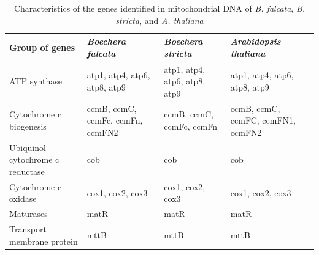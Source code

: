 \documentclass[9pt,twocolumn,twoside,lineno]{gsag3jnl}
\begin{document}
\begin{table}[p]
\centering
\caption{Characteristics of the genes identified in mitochondrial DNA of \textit{B. falcata}, \textit{B. stricta}, and \textit{A. thaliana}}
\begin{tableminipage}{\textwidth}
\begin{tabularx}{\textwidth}{@{}XXXX@{}}
\hline
\textbf{Group of genes}          & \textit{\textbf{Boechera falcata}}                                                                    & \textit{\textbf{Boechera stricta} }                                                        & \textit{\textbf{Arabidopsis thaliana}}                                                    \\
\hline
ATP synthase                     & atp1, atp4, atp6, atp8, atp9                                                                          & atp1, atp4, atp6, atp8, atp9                                                              & atp1, atp4, atp6, atp8, atp9                                                              \\
Cytochrome c biogenesis          & ccmB, ccmC, ccmFc, ccmFn, ccmFN2                                                                      & ccmB, ccmC, ccmFc, ccmFn                                                                  & ccmB, ccmC, ccmFC, ccmFN1, ccmFN2                                                         \\
Ubiquinol cytochrome c reductase & cob                                                                                                   & cob                                                                                       & cob                                                                                       \\
Cytochrome c oxidase             & cox1, cox2, cox3                                                                                      & cox1, cox2, cox3                                                                          & cox1, cox2, cox3                                                                          \\
Maturases                        & matR                                                                                                  & matR                                                                                      & matR                                                                                      \\
Transport membrane protein       & mttB                                                                                                  & mttB                                                                                      & mttB                                                                                      \\

\end{tabularx}
\end{tableminipage}
\end{table}
\end{document}
